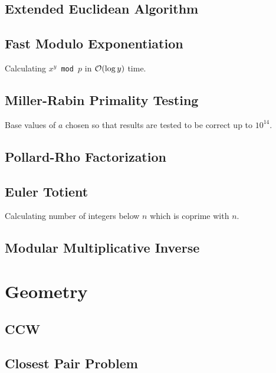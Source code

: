\documentclass[landscape,8pt]{article}
\begin{document}
\begin{multicols}{2}
  \subsection{Extended Euclidean Algorithm}
    
  \subsection{Fast Modulo Exponentiation}
  Calculating \texttt{$x^y$ mod $p$} in $\order{\log y}$ time.
    

  \subsection{Miller-Rabin Primality Testing}
  Base values of $a$ chosen so that results are tested to be correct up to $10^14$.
    

  \subsection{Pollard-Rho Factorization}
    

  \subsection{Euler Totient}
  Calculating number of integers below $n$ which is coprime with $n$.
    

  \subsection{Modular Multiplicative Inverse}
    

\columnbreak
\section{Geometry}
  \subsection{CCW}
    
  \subsection{Closest Pair Problem}


\end{multicols}
\end{document}
